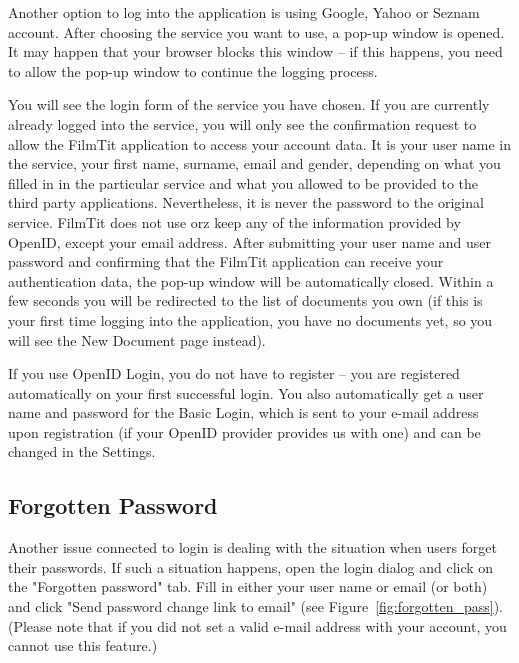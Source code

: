 Another option to log into the application is using Google, Yahoo or Seznam account. After choosing the service you want to use, a pop-up window is opened. It may happen that your browser blocks this window -- if this happens, you need to allow the pop-up window to continue the logging process.

You will see the login form of the service you have chosen. If you are currently already logged into the service, you will only see the confirmation request to allow the FilmTit application to access your account data. It is your user name in the service, your first name, surname, email and gender, depending on what you filled in in the particular service and what you allowed to be provided to the third party applications. Nevertheless, it is never the password to the original service. FilmTit does not use orz keep any of the information provided by OpenID, except your email address.
After submitting your user name and user password and confirming that the FilmTit application can receive your authentication data, the pop-up window will be automatically closed. Within a few seconds you will be redirected to the list of documents you own (if this is your first time logging into the application, you have no documents yet, so you will see the New Document page instead).

If you use OpenID Login, you do not have to register -- you are registered automatically on your first successful login. You also automatically get a user name and password for the Basic Login, which is sent to your e-mail address upon registration (if your OpenID provider provides us with one) and can be changed in the Settings.

\subsection{Forgotten Password}

Another issue connected to login is dealing with the situation when users forget their passwords. If such a situation happens, open the login dialog and click on the "Forgotten password" tab. Fill in either your user name or email (or both) and click "Send password change link to email" (see Figure~\ref{fig:forgotten_pass}). (Please note that if you did not set a valid e-mail address with your account, you cannot use this feature.)

